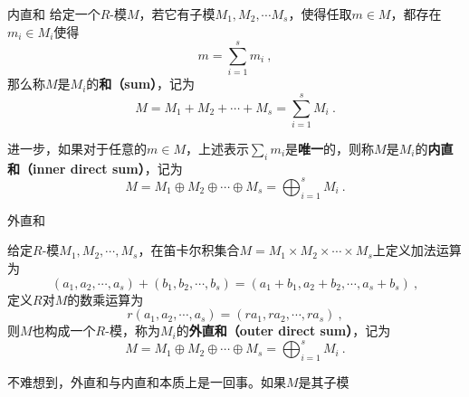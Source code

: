 





\begin{definition}{内直和}
给定一个$R$-模$M$，若它有子模$M_1, M_2, \cdots M_s$，使得任取$m\in M$，都存在$m_i\in M_i$使得
\begin{equation}
m = \sum_{i=1}^{s} m_i~, 
\end{equation}
那么称$M$是$M_i$的\textbf{和（sum）}，记为
\begin{equation}
M=M_1+M_2+\cdots+M_s=\sum_{i=1}^s M_i~.
\end{equation}

进一步，如果对于任意的$m\in M$，上述表示$\sum_i m_i$是\textbf{唯一}的，则称$M$是$M_i$的\textbf{内直和（inner direct sum）}，记为
\begin{equation}
M=M_1\oplus M_2\oplus \cdots \oplus M_s= \bigoplus_{i=1}^s M_i~.
\end{equation}
\end{definition}


\begin{definition}{外直和}

给定$R$-模$M_1, M_2, \cdots, M_s$，在笛卡尔积集合$M=M_1\times M_2\times \cdots \times M_s$上定义加法运算为
\begin{equation}
(a_1, a_2, \cdots, a_s)+(b_1, b_2, \cdots, b_s) = (a_1+b_1, a_2+b_2, \cdots, a_s+b_s)~, 
\end{equation}
定义$R$对$M$的数乘运算为
\begin{equation}
r(a_1, a_2, \cdots, a_s) = (ra_1, ra_2, \cdots, ra_s)~, 
\end{equation}
则$M$也构成一个$R$-模，称为$M_i$的\textbf{外直和（outer direct sum）}，记为
\begin{equation}
M=M_1\oplus M_2\oplus \cdots \oplus M_s= \bigoplus_{i=1}^s M_i~.
\end{equation}

\end{definition}




不难想到，外直和与内直和本质上是一回事。如果$M$是其子模$$












